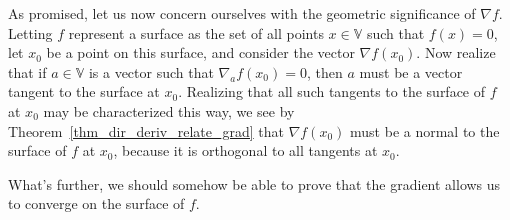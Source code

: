 \documentclass[12pt]{article}
\newcommand{\V}{\mathbb{V}}
\begin{document}
As promised, let us now concern ourselves with the geometric significance of $\nabla f$.
Letting $f$ represent a surface as the set of all points $x\in\V$ such that $f(x)=0$,
let $x_0$ be a point on this surface, and consider the vector $\nabla f(x_0)$.
Now realize that if $a\in\V$ is a vector such that $\nabla_a f(x_0)=0$, then
$a$ must be a vector tangent to the surface at $x_0$.  Realizing that all such tangents
to the surface of $f$ at $x_0$ may be characterized this way, we see by
Theorem~\ref{thm_dir_deriv_relate_grad} that $\nabla f(x_0)$ must be a normal
to the surface of $f$ at $x_0$, because it is orthogonal to all tangents at $x_0$.

What's further, we should somehow be able to prove that the gradient allows us to
converge on the surface of $f$.
\end{document}
